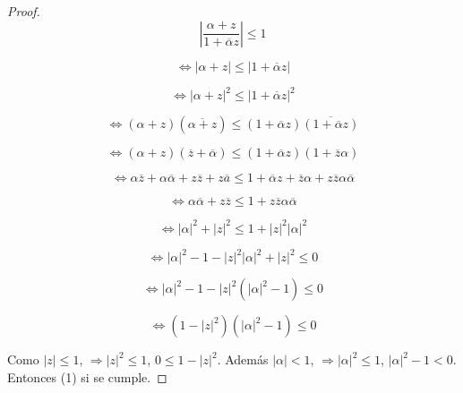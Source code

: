 \documentclass[11pt]{article}
\theoremstyle{Tema} \newtheorem{Tema}{Tema} %
\theoremstyle{Tema} \newtheorem{serie}{Serie}              %
\theoremstyle{Tema} \newtheorem{ejercicio}{Ejercicio}    %
\begin{document}
\begin{proof}
\begin{equation*}
\left|\dfrac{\alpha+z}{1+\overline{\alpha}z}\right|\leq 1
\end{equation*}

\begin{equation*}
\Leftrightarrow \left|{\alpha+z}\right|\leq \left|{1+\overline{\alpha}z}\right|
\end{equation*}

\begin{equation*}
\Leftrightarrow \left|{\alpha+z}\right|^2\leq \left|{1+\overline{\alpha}z}\right|^2
\end{equation*}

\begin{equation*}
\Leftrightarrow ({\alpha+z})(\overline{\alpha+z})\leq ({1+\overline{\alpha}z})\overline{({1+\overline{\alpha}z})}
\end{equation*}


\begin{equation*}
\Leftrightarrow ({\alpha+z})(\overline{z}+\overline{\alpha})\leq ({1+\overline{\alpha}z})({1+\overline{z}\alpha})
\end{equation*}


\begin{equation*}
\Leftrightarrow \alpha \overline{z}+ \alpha\overline{\alpha}+z\overline{z}+z\overline{a}\leq {1+\overline{\alpha}z +\overline{z}\alpha+z\overline{z}\alpha\overline{\alpha}}
\end{equation*}

\begin{equation*}
\Leftrightarrow \alpha\overline{\alpha}+z\overline{z}\leq {1 +z\overline{z}\alpha\overline{\alpha}}
\end{equation*}

\begin{equation*}
\Leftrightarrow |\alpha|^2+|z|^2\leq {1+|z|^2 |\alpha |^2}
\end{equation*}

\begin{equation*}
\Leftrightarrow |\alpha|^2- 1-|z|^2 |\alpha |^2+|z|^2\leq 0
\end{equation*}


\begin{equation*}
\Leftrightarrow |\alpha|^2- 1-|z|^2 (|\alpha |^2-1)\leq 0
\end{equation*}


\begin{equation}
\Leftrightarrow(1-|z|^2 ) (|\alpha |^2-1)\leq 0
\end{equation}

Como $|z|\leq 1$, $ \Rightarrow |z|^2\leq 1 $, $0\leq 1-|z|^2$. Adem\'as $ |\alpha|<1 $, $ \Rightarrow |\alpha|^2\leq 1 $, $ |\alpha|^2-1<0$.  Entonces (1) si se cumple.   

\end{proof}
\end{document}
